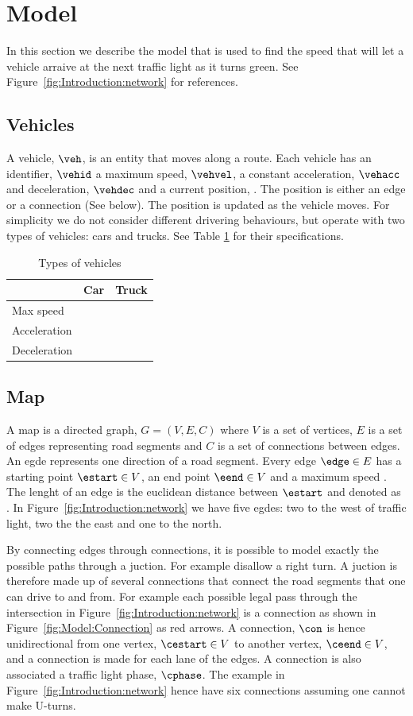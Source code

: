 \section{Model}
In this section we describe the model that is used to find the speed that will let a vehicle arraive at the next traffic light as it turns green.
See Figure~\ref{fig:Introduction:network} for references.

\subsection{Vehicles}
A vehicle, $\veh$, is an entity that moves along a route.
Each vehicle has an identifier, $\vehid$ a maximum speed, $\vehvel$, a constant acceleration, $\vehacc$ and deceleration, $\vehdec$ and a current position, \vehpos. 
The position is either an edge or a connection (See below).
The position is updated as the vehicle moves.
For simplicity we do not consider different drivering behaviours, but operate with two types of vehicles: cars and trucks. See Table \ref{table.vehicleTypes} for their specifications.
\begin{table}
\centering
\begin{tabular}{|l|l|l|}\hline
		& Car 	& Truck \\\hline
Max speed 	& 	& \\\hline
Acceleration 	&	& \\\hline
Deceleration 	&	& \\\hline
\end{tabular}
\caption{Types of vehicles}\label{table.vehicleTypes}
\end{table}

\subsection{Map}
A map is a directed graph, $G = (V, E, C)$ where $V$ is a set of vertices, $E$ is a set of edges representing road segments and $C$ is a set of connections between edges.
An egde represents one direction of a road segment.
Every edge $\edge\in E$ has a starting point $\estart\in V$, an end point $\eend\in V$ and a maximum speed \espeed. 
The lenght of an edge is the euclidean distance between $\estart$ and \eend denoted as \elength.
In Figure~\ref{fig:Introduction:network} we have five egdes: two to the west of traffic light, two the the east and one to the north. %

By connecting edges through connections, it is possible to model exactly the possible paths through a juction. 
For example disallow a right turn.
A juction is therefore made up of several connections that connect the road segments that one can drive to and from.
For example each possible legal pass through the intersection in Figure~\ref{fig:Introduction:network} is a connection as shown in Figure~\ref{fig:Model:Connection} as red arrows. 
A connection, $\con$ is hence unidirectional from one vertex, $\cestart\in V$ to another vertex, $\ceend \in V$, and a connection is made for each lane of the edges.
A connection is also associated a traffic light phase, $\cphase$. 
The example in Figure~\ref{fig:Introduction:network} hence have six connections assuming one cannot make U-turns.

